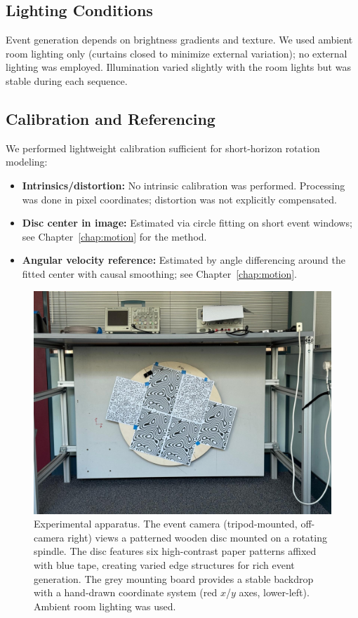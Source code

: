 \subsection{Lighting Conditions}
Event generation depends on brightness gradients and texture. We used ambient room lighting only (curtains closed to minimize external variation); no external lighting was employed. Illumination varied slightly with the room lights but was stable during each sequence.

\subsection{Calibration and Referencing}
We performed lightweight calibration sufficient for short-horizon rotation modeling:

\begin{itemize}
  \item \textbf{Intrinsics/distortion:} No intrinsic calibration was performed. Processing was done in pixel coordinates; distortion was not explicitly compensated.
  \item \textbf{Disc center in image:} Estimated via circle fitting on short event windows; see Chapter~\ref{chap:motion} for the method.
  \item \textbf{Angular velocity reference:} Estimated by angle differencing around the fitted center with causal smoothing; see Chapter~\ref{chap:motion}.
\end{itemize}

\begin{figure}[t]
  \centering
  \includegraphics[width=0.85\linewidth]{images/setup_2.jpeg}
  \caption{Experimental apparatus. The event camera (tripod-mounted, off-camera right) views a patterned wooden disc mounted on a rotating spindle. The disc features six high-contrast paper patterns affixed with blue tape, creating varied edge structures for rich event generation. The grey mounting board provides a stable backdrop with a hand-drawn coordinate system (red $x$/$y$ axes, lower-left). Ambient room lighting was used.}
  \label{fig:rig}
\end{figure}

